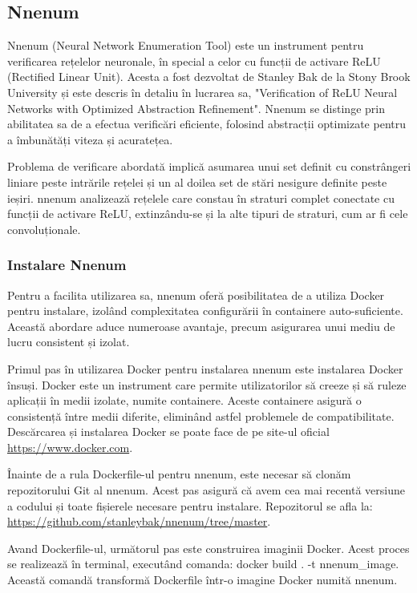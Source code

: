 \documentclass[12pt,a4paper]{article}
\begin{document}
\subsection{Nnenum}
Nnenum (Neural Network Enumeration Tool) este un instrument pentru verificarea rețelelor neuronale, în special a celor cu funcții de activare ReLU (Rectified Linear Unit). Acesta a fost dezvoltat de Stanley Bak de la Stony Brook University și este descris în detaliu în lucrarea sa,  "Verification of ReLU Neural Networks with Optimized Abstraction Refinement". Nnenum se distinge prin abilitatea sa de a efectua verificări eficiente, folosind abstracții optimizate pentru a îmbunătăți viteza și acuratețea.

Problema de verificare abordată implică asumarea unui set definit cu constrângeri liniare peste intrările rețelei și un al doilea set de stări nesigure definite peste ieșiri. nnenum analizează rețelele care constau în straturi complet conectate cu funcții de activare ReLU, extinzându-se și la alte tipuri de straturi, cum ar fi cele convoluționale.

\subsubsection{Instalare Nnenum}

Pentru a facilita utilizarea sa, nnenum oferă posibilitatea de a utiliza Docker pentru instalare, izolând complexitatea configurării în containere auto-suficiente. Această abordare aduce numeroase avantaje, precum asigurarea unui mediu de lucru consistent și izolat.

Primul pas în utilizarea Docker pentru instalarea nnenum este instalarea Docker însuși. Docker este un instrument care permite utilizatorilor să creeze și să ruleze aplicații în medii izolate, numite containere. Aceste containere asigură o consistență între medii diferite, eliminând astfel problemele de compatibilitate. Descărcarea și instalarea Docker se poate face de pe site-ul oficial \url{https://www.docker.com}.

Înainte de a rula Dockerfile-ul pentru nnenum, este necesar să clonăm repozitorului Git al nnenum. Acest pas asigură că avem cea mai recentă versiune a codului și toate fișierele necesare pentru instalare. Repozitorul se afla la: \url{https://github.com/stanleybak/nnenum/tree/master}.

Avand Dockerfile-ul, următorul pas este construirea imaginii Docker. Acest proces se realizează în terminal, executând comanda:
docker build . -t nnenum\_image.
Această comandă transformă Dockerfile într-o imagine Docker numită nnenum.
\end{document}

